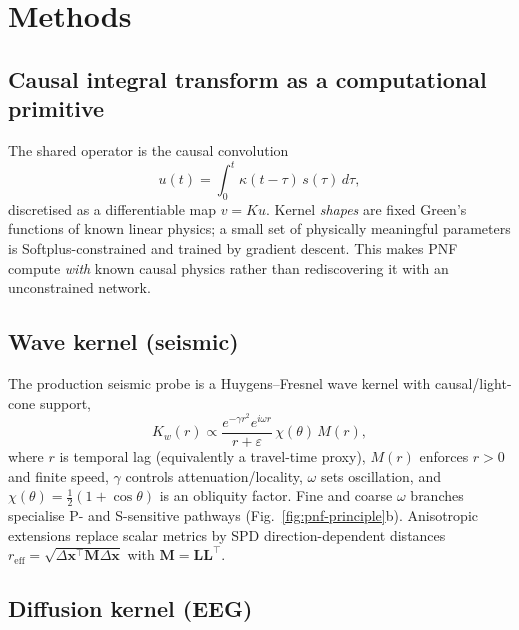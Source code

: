 \documentclass[twocolumn, 10pt]{article}
\newcommand{\pnf}{\textsc{PNF}}
\begin{document}

\section*{Methods}

\subsection*{Causal integral transform as a computational primitive}

The shared operator is the causal convolution
\begin{equation}
u(t)=\int_{0}^{t}\kappa(t-\tau)\,s(\tau)\,d\tau,
\label{eq:causal}
\end{equation}
discretised as a differentiable map \(v=Ku\). Kernel \emph{shapes} are fixed Green's functions of known linear physics; a small set of physically meaningful parameters is Softplus-constrained and trained by gradient descent. This makes \pnf{} compute \emph{with} known causal physics rather than rediscovering it with an unconstrained network.

\subsection*{Wave kernel (seismic)}

The production seismic probe is a Huygens--Fresnel wave kernel with causal/light-cone support\cite{akei2002,morse1953},
\begin{equation}
K_w(r)\propto \frac{e^{-\gamma r^{2}}e^{i\omega r}}{r+\varepsilon}\,\chi(\theta)\,M(r),
\end{equation}
where \(r\) is temporal lag (equivalently a travel-time proxy), \(M(r)\) enforces \(r>0\) and finite speed, \(\gamma\) controls attenuation/locality, \(\omega\) sets oscillation, and \(\chi(\theta)=\tfrac12(1+\cos\theta)\) is an obliquity factor. Fine and coarse \(\omega\) branches specialise P- and S-sensitive pathways (Fig.~\ref{fig:pnf-principle}b). Anisotropic extensions replace scalar metrics by SPD direction-dependent distances \(r_{\mathrm{eff}}=\sqrt{\Delta\mathbf{x}^{\top}\mathbf{M}\Delta\mathbf{x}}\) with \(\mathbf{M}=\mathbf{L}\mathbf{L}^{\top}\).

\subsection*{Diffusion kernel (EEG)}
\end{document}
